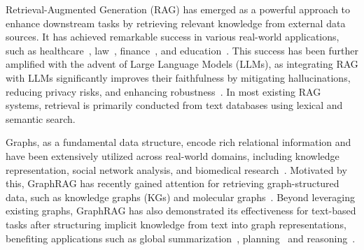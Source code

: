 Retrieval-Augmented Generation (RAG) has emerged as a powerful approach to enhance downstream tasks by retrieving relevant knowledge from external data sources. It has achieved remarkable success in various real-world applications, such as healthcare~\citep{xu2024ram}, law~\citep{wiratunga2024cbr}, finance~\citep{zhang2023enhancing}, and education~\citep{miladi2024leveraging}. This success has been further amplified with the advent of Large Language Models (LLMs), as integrating RAG with LLMs significantly improves their faithfulness
by mitigating hallucinations, reducing privacy risks, and enhancing robustness~\cite{zhao2023survey, huang2023survey}. In most existing RAG systems, retrieval is primarily conducted from text databases using lexical and semantic search.

Graphs, as a fundamental data structure, encode rich relational information and have been extensively utilized across real-world domains, including knowledge representation, social network analysis, and biomedical research~\cite{wu2020comprehensive, ma2021deep, wu2023survey}. Motivated by this, GraphRAG has recently gained attention for retrieving graph-structured data, 
such as knowledge graphs (KGs) and molecular graphs~\citep{han2024retrieval, peng2024graph}. Beyond leveraging existing graphs, GraphRAG has also demonstrated its effectiveness for text-based tasks after
structuring implicit knowledge from text into graph representations, benefiting applications such as global summarization~\cite{edge2024local, zhang2024graph}, planning~\cite{lin2024graph} and reasoning~\cite{han2025reasoning}. 

